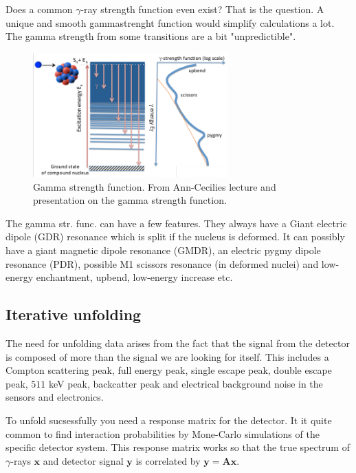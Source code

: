 \documentclass[%
 reprint,
 amsmath,amssymb,
 aps,
 norsk
]{revtex4-1}
\begin{document}
Does a common $\gamma$-ray strength function even exist? That is the question. A unique and smooth gammastrenght function would simplify calculations a lot. The gamma strength from some transitions are a bit "unpredictible".


\begin{figure}
	\includegraphics[angle=0, width = 75mm]{gammastr_anncecilie.png}
	\caption{ Gamma strength function. From Ann-Cecilies lecture and presentation on the gamma strength function. \label{fig:gammastr_anncecilie}}
\end{figure}

The gamma str. func. can have a few features. They always have a Giant electric dipole (GDR) resonance which is split if the nucleus is deformed. It can possibly have a giant magnetic dipole resonance (GMDR), an electric pygmy dipole resonance (PDR), possible M1 scissors resonance (in deformed nuclei) and low-energy enchantment, upbend, low-energy increase etc.









\subsection{Iterative unfolding}
The need for unfolding data arises from the fact that the signal from the detector is composed of more than the signal we are looking for itself. 
This includes a Compton scattering peak, full energy peak, single escape peak, double escape peak, $511$ keV peak, backcatter peak and electrical background noise in the sensors and electronics.

To unfold sucsessfully you need a response matrix for the detector. It it quite common to find interaction probabilities by Mone-Carlo simulations of the specific detector system. This response matrix works so that the true spectrum of $\gamma$-rays $\mathbf{x}$ and detector signal $\mathbf{y}$ is correlated by $\mathbf{y} = \mathbf{Ax}$.
\end{document}
